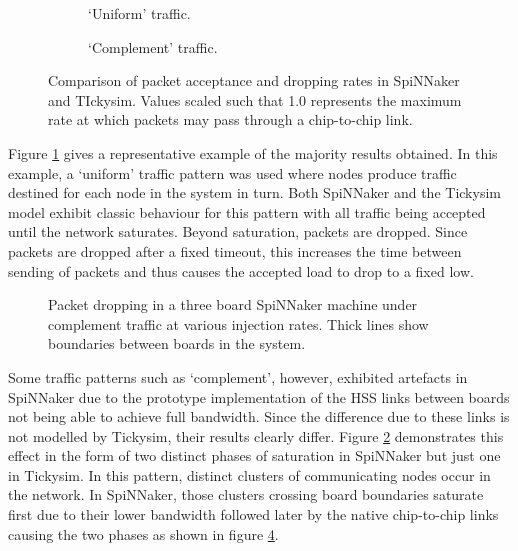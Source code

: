			\begin{figure}
				\begin{subfigure}{\textwidth}
					
					
					\caption{`Uniform' traffic.}
					\label{fig:results-144-accuracy-cyclic}
				\end{subfigure}
				
				\vspace{1em}
				
				\begin{subfigure}{\textwidth}
					
					
					\caption{`Complement' traffic.}
					\label{fig:results-144-accuracy-complement}
				\end{subfigure}
				
				\caption[Packet acceptance and dropping in SpiNNaker
				and TIckysim.]{Comparison of packet acceptance and dropping rates in
				SpiNNaker and TIckysim. Values scaled such that 1.0 represents the
				maximum rate at which packets may pass through a chip-to-chip link.}
				\label{fig:results-144-accuracy}
			\end{figure}
			
			Figure \ref{fig:results-144-accuracy-cyclic} gives a representative
			example of the majority results obtained. In this example, a `uniform'
			traffic pattern was used where nodes produce traffic destined for each
			node in the system in turn. Both SpiNNaker and the Tickysim model exhibit
			classic behaviour for this pattern with all traffic being accepted until
			the network saturates.  Beyond saturation, packets are dropped. Since
			packets are dropped after a fixed timeout, this increases the time between
			sending of packets and thus causes the accepted load to drop to a fixed
			low.
			
			\begin{figure}
				\center
				
				\caption[Packet dropping in a three board SpiNNaker machine.]{Packet
				dropping in a three board SpiNNaker machine under complement traffic at
				various injection rates. Thick lines show boundaries between boards in
				the system.}
				\label{fig:heatmap-spinnaker-complement}
			\end{figure}
			
			Some traffic patterns such as `complement', however, exhibited artefacts
			in SpiNNaker due to the prototype implementation of the HSS links between
			boards not being able to achieve full bandwidth. Since the difference due
			to these links is not modelled by Tickysim, their results clearly differ.
			Figure \ref{fig:results-144-accuracy-complement} demonstrates this effect
			in the form of two distinct phases of saturation in SpiNNaker but just one
			in Tickysim. In this pattern, distinct clusters of communicating nodes
			occur in the network. In SpiNNaker, those clusters crossing board
			boundaries saturate first due to their lower bandwidth followed later by
			the native chip-to-chip links causing the two phases as shown in figure
			\ref{fig:heatmap-spinnaker-complement}.
		
